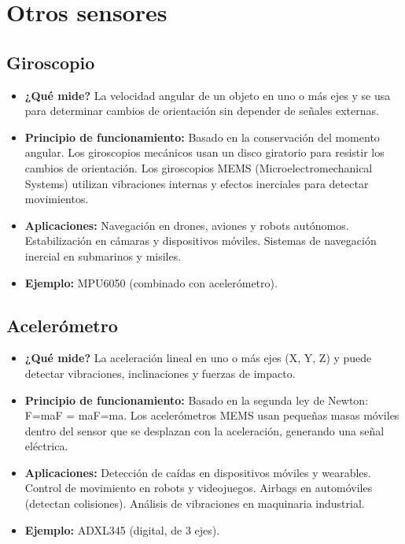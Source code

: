 \section{Otros sensores}
\subsection*{Giroscopio}
\begin{itemize}
	\item \textbf{¿Qué mide?} La velocidad angular de un objeto en uno o más ejes y se usa para determinar cambios de orientación sin depender de señales externas.
	\item \textbf{Principio de funcionamiento:} Basado en la conservación del momento angular.
	Los giroscopios mecánicos usan un disco giratorio para resistir los cambios de orientación.
	Los giroscopios MEMS (Microelectromechanical Systems) utilizan vibraciones internas y efectos inerciales para detectar movimientos.
	
	\item \textbf{Aplicaciones:} Navegación en drones, aviones y robots autónomos.
	Estabilización en cámaras y dispositivos móviles.
	Sistemas de navegación inercial en submarinos y misiles.
	\item \textbf{Ejemplo:} MPU6050 (combinado con acelerómetro).
\end{itemize}
\subsection*{Acelerómetro}
\begin{itemize}
	\item \textbf{¿Qué mide?} La aceleración lineal en uno o más ejes (X, Y, Z) y puede detectar vibraciones, inclinaciones y fuerzas de impacto.
	\item \textbf{Principio de funcionamiento:} Basado en la segunda ley de Newton: F=maF = maF=ma.
	Los acelerómetros MEMS usan pequeñas masas móviles dentro del sensor que se desplazan con la aceleración, generando una señal eléctrica.
	\item \textbf{Aplicaciones:} Detección de caídas en dispositivos móviles y wearables.
	Control de movimiento en robots y videojuegos.
	Airbags en automóviles (detectan colisiones).
	Análisis de vibraciones en maquinaria industrial.
	\item \textbf{Ejemplo:} ADXL345 (digital, de 3 ejes).
\end{itemize}
